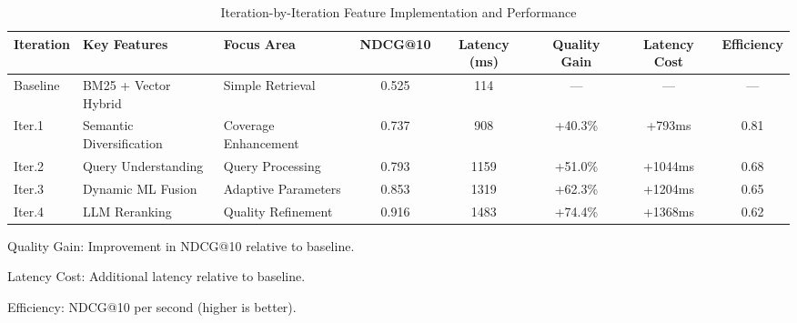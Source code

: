 \begin{table*}[htbp]
\centering
\caption{Iteration-by-Iteration Feature Implementation and Performance}
\label{tab:iteration-comparison}
\begin{tabular}{lllccccc}
\toprule
Iteration & Key Features & Focus Area & NDCG@10 & Latency (ms) & Quality Gain & Latency Cost & Efficiency \\
\midrule
Baseline & BM25 + Vector Hybrid & Simple Retrieval & 0.525 & 114 & — & — & — \\
Iter.1 & Semantic Diversification & Coverage Enhancement & 0.737 & 908 & +40.3\% & +793ms & 0.81 \\
Iter.2 & Query Understanding & Query Processing & 0.793 & 1159 & +51.0\% & +1044ms & 0.68 \\
Iter.3 & Dynamic ML Fusion & Adaptive Parameters & 0.853 & 1319 & +62.3\% & +1204ms & 0.65 \\
Iter.4 & LLM Reranking & Quality Refinement & 0.916 & 1483 & +74.4\% & +1368ms & 0.62 \\
\bottomrule
\end{tabular}
\begin{tablenotes}
\small
\item Quality Gain: Improvement in NDCG@10 relative to baseline.
\item Latency Cost: Additional latency relative to baseline.  
\item Efficiency: NDCG@10 per second (higher is better).
\end{tablenotes}
\end{table*}
